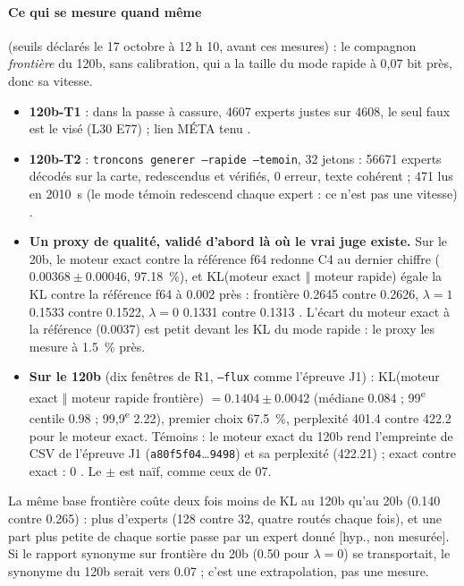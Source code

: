 \paragraph{Ce qui se mesure quand même} (seuils déclarés le 17 octobre à 12 h 10, avant ces mesures) : le compagnon \emph{frontière} du 120b, sans calibration, qui a la taille du mode rapide à 0,07 bit près, donc sa vitesse.
\begin{itemize}
\item \textbf{120b-T1} : dans la passe à cassure, \num{4607} experts justes sur \num{4608}, le seul faux est le visé (L30 E77) ; lien MÉTA tenu \mes.
\item \textbf{120b-T2} : \texttt{troncons generer --rapide --temoin}, 32 jetons : \num{56671} experts décodés sur la carte, redescendus et vérifiés, 0 erreur, texte cohérent ; \SI{471}{\Go} lus en \SI{2010}{\second} (le mode témoin redescend chaque expert : ce n'est pas une vitesse) \mes.
\item \textbf{Un proxy de qualité, validé d'abord là où le vrai juge existe.} Sur le 20b, le moteur exact contre la référence f64 redonne C4 au dernier chiffre ($\num{0.00368} \pm \num{0.00046}$, \SI{97.18}{\percent}), et KL(moteur exact $\Vert$ moteur rapide) égale la KL contre la référence f64 à \num{0.002} près : frontière \num{0.2645} contre \num{0.2626}, $\lambda = 1$ \num{0.1533} contre \num{0.1522}, $\lambda = 0$ \num{0.1331} contre \num{0.1313} \mes. L'écart du moteur exact à la référence (\num{0.0037}) est petit devant les KL du mode rapide : le proxy les mesure à \SI{1.5}{\percent} près.
\item \textbf{Sur le 120b} (dix fenêtres de R1, \texttt{--flux} comme l'épreuve J1) : KL(moteur exact $\Vert$ moteur rapide frontière) $= \num{0.1404} \pm \num{0.0042}$ (médiane \num{0.084} ; 99\textsuperscript{e} centile \num{0.98} ; 99,9\textsuperscript{e} \num{2.22}), premier choix \SI{67.5}{\percent}, perplexité \num{401.4} contre \num{422.2} pour le moteur exact. Témoins : le moteur exact du 120b rend l'empreinte de CSV de l'épreuve J1 (\texttt{a80f5f04}…\texttt{9498}) et sa perplexité (\num{422.21}) ; exact contre exact : 0 \mes. Le $\pm$ est naïf, comme ceux de 07.
\end{itemize}
La même base frontière coûte deux fois moins de KL au 120b qu'au 20b (\num{0.140} contre \num{0.265}) : plus d'experts (128 contre 32, quatre routés chaque fois), et une part plus petite de chaque sortie passe par un expert donné [hyp., non mesurée]. Si le rapport synonyme sur frontière du 20b (\num{0.50} pour $\lambda = 0$) se transportait, le synonyme du 120b serait vers \num{0.07} ; c'est une extrapolation, pas une mesure.

